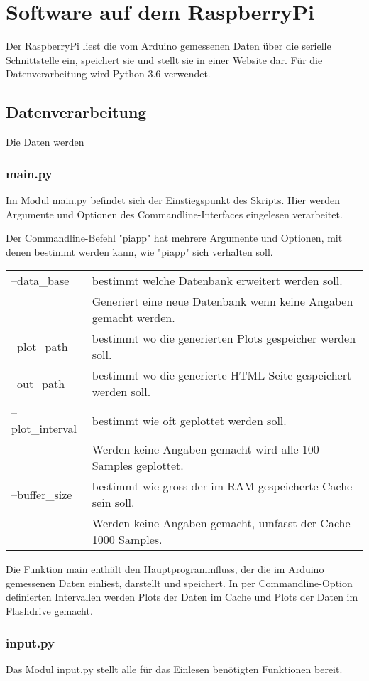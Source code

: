 \documentclass{article}
\begin{document}
\section{Software auf dem RaspberryPi}
Der RaspberryPi liest die vom Arduino gemessenen Daten über die serielle Schnittstelle ein, speichert sie und stellt sie in einer Website dar.
Für die Datenverarbeitung wird Python 3.6 verwendet.
\subsection{Datenverarbeitung}
Die Daten werden

\subsubsection{main.py}
Im Modul main.py befindet sich der Einstiegspunkt des Skripts.
Hier werden Argumente und Optionen des Commandline-Interfaces eingelesen verarbeitet.

Der Commandline-Befehl "piapp" hat mehrere Argumente und Optionen, mit denen bestimmt werden kann, wie "piapp" sich verhalten soll.

\begin{tabular}{l l}
--data\_base     & bestimmt welche Datenbank erweitert werden soll. \\
~                & Generiert eine neue Datenbank wenn keine Angaben gemacht werden. \\
--plot\_path     & bestimmt wo die generierten Plots gespeicher werden soll. \\
--out\_path      & bestimmt wo die generierte HTML-Seite gespeichert werden soll. \\
--plot\_interval & bestimmt wie oft geplottet werden soll. \\
~                & Werden keine Angaben gemacht wird alle 100 Samples geplottet. \\
--buffer\_size   & bestimmt wie gross der im RAM gespeicherte Cache sein soll. \\
~                & Werden keine Angaben gemacht, umfasst der Cache 1000 Samples. 
\end{tabular}

Die Funktion main enthält den Hauptprogrammfluss, der die im Arduino gemessenen Daten einliest, darstellt und speichert.
In per Commandline-Option definierten Intervallen werden Plots der Daten im Cache und Plots der Daten im Flashdrive gemacht.

\subsubsection{input.py}
Das Modul input.py stellt alle für das Einlesen benötigten Funktionen bereit.
\end{document}
